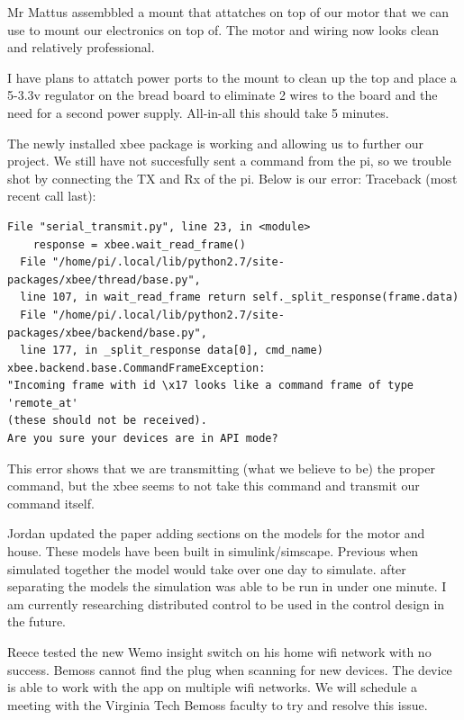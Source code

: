 \documentclass[fontsize=11pt, %
                             paper=letter, %
                             twoside, %
                             captions=tableheading,
                             index=totoc,
                             hyperref]{labbook}
\begin{document}
Mr Mattus assembbled a mount that attatches on top of our motor that we can use to mount our electronics on top of. The motor and wiring now looks clean and relatively professional. 



I have plans to attatch power ports to the mount to clean up the top and place a 5-3.3v regulator on the bread board to eliminate 2 wires to the board and the need for a second power supply. All-in-all this should take 5 minutes. 

The newly installed xbee package is working and allowing us to further our project. We still have not succesfully sent a command from the pi, so we trouble shot by connecting the TX and Rx of the pi. Below is our error: 
Traceback (most recent call last):

\begin{verbatim}
File "serial_transmit.py", line 23, in <module>
    response = xbee.wait_read_frame()
  File "/home/pi/.local/lib/python2.7/site-packages/xbee/thread/base.py", 
  line 107, in wait_read_frame return self._split_response(frame.data)
  File "/home/pi/.local/lib/python2.7/site-packages/xbee/backend/base.py", 
  line 177, in _split_response data[0], cmd_name)
xbee.backend.base.CommandFrameException: 
"Incoming frame with id \x17 looks like a command frame of type 'remote_at' 
(these should not be received). 
Are you sure your devices are in API mode?    
\end{verbatim}
  


This error shows that we are transmitting (what we believe to be) the proper command, but the xbee seems to not take this command and transmit our command itself.

Jordan updated the paper adding sections on the models for the motor and house. These models have been built in simulink/simscape. Previous when simulated together the model would take over one day to simulate. after separating the models the simulation was able to be run in under one minute. I am currently researching distributed control to be used in the control design in the future. 


Reece tested the new Wemo insight switch on his home wifi network with no success. Bemoss cannot find the plug when scanning for new devices. The device is able to work with the app on multiple wifi networks. We will schedule a meeting with the Virginia Tech Bemoss faculty to try and resolve this issue. 
\end{document}
